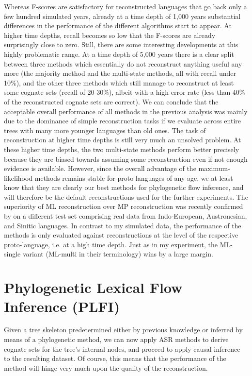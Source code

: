 Whereas F-scores are satisfactory for reconstructed languages that go back only a few hundred simulated years, already at a time depth of 1,000 years substantial differences in the performance of the different algorithms start to appear. At higher time depths, recall becomes so low that the F-scores are already surprisingly close to zero. Still, there are some interesting developments at this highly problematic range. At a time depth of 5,000 years there is a clear split between three methods which essentially do not reconstruct anything useful any more (the majority method and the multi-state methods, all with recall under 10\%), and the other three methods which still manage to reconstruct at least some cognate sets (recall of 20-30\%), albeit with a high error rate (less than 40\% of the reconstructed cognate sets are correct). We can conclude that the acceptable overall performance of all methods in the previous analysis was mainly due to the dominance of simple reconstruction tasks if we evaluate across 
entire trees with many more younger languages than old ones. The task of reconstruction at higher time depths is still very much an unsolved problem. At these higher time depths, the two multi-state methods perform better precisely because they are biased towards assuming some reconstruction even if not enough evidence is available. However, since the overall advantage of the maximum-likelihood methods remains stable for proto-lan\-guages of any age, we at least know that they are clearly our best methods for phylogenetic flow inference, and will therefore be the default reconstructions used for the further experiments. The superiority of ML reconstruction over MP reconstruction was recently confirmed by \cite{jaeger_list_2017} on a different test set comprising real data from Indo-European, Austronesian, and Sinitic languages. In contrast to my simulated data, the performance of the methods is only evaluated against reconstructions at the level of the respective proto-language, i.e. at a high time depth. Just 
as in my experiment, the ML-single variant (ML-multi in their terminology) wins by a large margin.

\largerpage
\section{Phylogenetic Lexical Flow Inference (PLFI)}\label{sec:6.8}
Given a tree skeleton predetermined either by previous knowledge or inferred by means of a phylogenetic method, we can now apply ASR methods to derive cognate sets for the tree's internal nodes, and proceed to apply causal inference to the resulting dataset. Of course, this means that the performance of the method will hinge very much upon the quality of the reconstruction.


